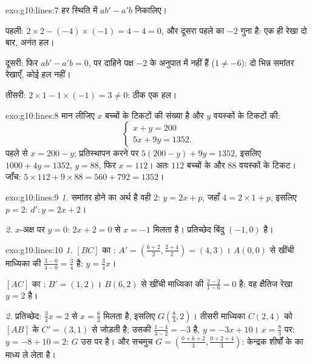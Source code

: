 \begin{solution}{exo:g10:lines:7}
हर स्थिति में $ab' - a'b$ निकालिए।

पहली: $2 \times 2 - (-4) \times (-1) = 4 - 4 = 0$, और दूसरा  पहले का $-2$ गुना है: एक ही रेखा दो बार, अनंत
हल।

दूसरी: फिर $ab' - a'b = 0$, पर दाहिने पक्ष $-2$ के अनुपात में नहीं हैं ($1 \neq -6$): दो भिन्न
समांतर रेखाएँ, कोई हल नहीं।

तीसरी: $2 \times 1 - 1 \times (-1) = 3 \neq 0$: ठीक एक हल।
\end{solution}

\begin{solution}{exo:g10:lines:8}
मान लीजिए $x$ बच्चों के टिकटों की संख्या है और $y$ वयस्कों के टिकटों की:
\[
\begin{cases}
x + y = 200 \\
5x + 9y = 1352 .
\end{cases}
\]
पहले  से $x = 200 - y$; प्रतिस्थापन करने पर $5(200 - y) + 9y = 1352$, इसलिए $1000 + 4y = 1352$, $y = 88$, फिर $x = 112$।
अतः $112$ बच्चों के और $88$ वयस्कों के टिकट। जाँच: $5 \times 112 + 9 \times 88 = 560 + 792 = 1352$।
\end{solution}

\begin{solution}{exo:g10:lines:9}
\emph{1.} समांतर होने का अर्थ है वही  $2$: $y = 2x + p$, जहाँ $4 = 2 \times 1 + p$, इसलिए
$p = 2$: $d'\colon y = 2x + 2$।

\emph{2.} $x$-अक्ष पर $y = 0$: $2x + 2 = 0$ से $x = -1$ मिलता है। प्रतिच्छेद बिंदु $(-1, 0)$
है।
\end{solution}

\begin{solution}{exo:g10:lines:10}
\emph{1.} $[BC]$ का : $A' = \left(\frac{6+2}{2},
\frac{2+4}{2}\right) = (4, 3)$। $A(0,0)$ से खींची माध्यिका की 
$\frac{3 - 0}{4 - 0} = \frac34$ है:  $y = \frac34 x$।

$[AC]$ का : $B' = (1, 2)$। $B(6, 2)$ से खींची माध्यिका की  $\frac{2 - 2}{1 - 6} = 0$ है: वह
क्षैतिज रेखा $y = 2$ है।

\emph{2.} प्रतिच्छेद: $\frac34 x = 2$ से $x = \frac83$ मिलता है, इसलिए $G\left(\frac83, 2\right)$। तीसरी माध्यिका
$C(2,4)$ को $[AB]$ के  $C' = (3, 1)$ से जोड़ती है; उसकी  $\frac{1 - 4}{3 - 2} = -3$ है,
 $y = -3x + 10$। $x = \frac83$ पर: $y = -8 + 10 = 2$: $G$ उस पर है। और सचमुच $G = \left(\frac{0 + 6 + 2}{3}, \frac{0 + 2 + 4}{3}\right)$: केन्द्रक
शीर्षों के  का माध्य ले लेता है।
\end{solution}

